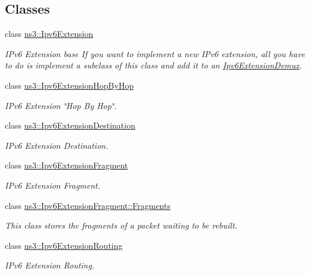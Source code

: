 \subsection*{Classes}
\begin{DoxyCompactItemize}
\item 
class \hyperlink{classns3_1_1Ipv6Extension}{ns3\+::\+Ipv6\+Extension}
\begin{DoxyCompactList}\small\item\em I\+Pv6 Extension base If you want to implement a new I\+Pv6 extension, all you have to do is implement a subclass of this class and add it to an \hyperlink{classns3_1_1Ipv6ExtensionDemux}{Ipv6\+Extension\+Demux}. \end{DoxyCompactList}\item 
class \hyperlink{classns3_1_1Ipv6ExtensionHopByHop}{ns3\+::\+Ipv6\+Extension\+Hop\+By\+Hop}
\begin{DoxyCompactList}\small\item\em I\+Pv6 Extension \char`\"{}\+Hop By Hop\char`\"{}. \end{DoxyCompactList}\item 
class \hyperlink{classns3_1_1Ipv6ExtensionDestination}{ns3\+::\+Ipv6\+Extension\+Destination}
\begin{DoxyCompactList}\small\item\em I\+Pv6 Extension Destination. \end{DoxyCompactList}\item 
class \hyperlink{classns3_1_1Ipv6ExtensionFragment}{ns3\+::\+Ipv6\+Extension\+Fragment}
\begin{DoxyCompactList}\small\item\em I\+Pv6 Extension Fragment. \end{DoxyCompactList}\item 
class \hyperlink{classns3_1_1Ipv6ExtensionFragment_1_1Fragments}{ns3\+::\+Ipv6\+Extension\+Fragment\+::\+Fragments}
\begin{DoxyCompactList}\small\item\em This class stores the fragments of a packet waiting to be rebuilt. \end{DoxyCompactList}\item 
class \hyperlink{classns3_1_1Ipv6ExtensionRouting}{ns3\+::\+Ipv6\+Extension\+Routing}
\begin{DoxyCompactList}\small\item\em I\+Pv6 Extension Routing. \end{DoxyCompactList}\item 

\end{DoxyCompactItemize}
